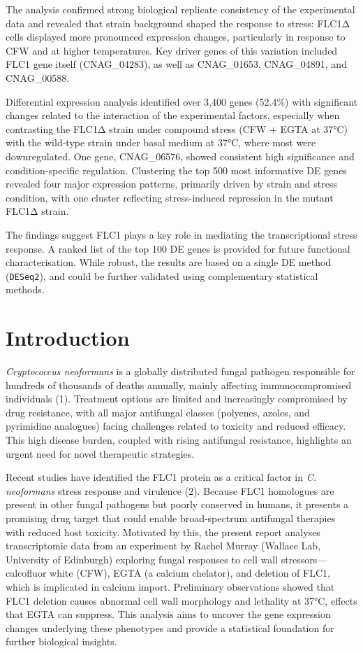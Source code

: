 \documentclass[
  a4paper,
]{scrreprt}
\begin{document}
The analysis confirmed strong biological replicate consistency of the
experimental data and revealed that strain background shaped the
response to stress: FLC1Δ cells displayed more pronounced expression
changes, particularly in response to CFW and at higher temperatures. Key
driver genes of this variation included FLC1 gene itself (CNAG\_04283),
as well as CNAG\_01653, CNAG\_04891, and CNAG\_00588.

Differential expression analysis identified over 3,400 genes (52.4\%)
with significant changes related to the interaction of the experimental
factors, especially when contrasting the FLC1Δ strain under compound
stress (CFW + EGTA at 37°C) with the wild-type strain under basal medium
at 37°C, where most were downregulated. One gene, CNAG\_06576, showed
consistent high significance and condition-specific regulation.
Clustering the top 500 most informative DE genes revealed four major
expression patterns, primarily driven by strain and stress condition,
with one cluster reflecting stress-induced repression in the mutant
FLC1Δ strain.

The findings suggest FLC1 plays a key role in mediating the
transcriptional stress response. A ranked list of the top 100 DE genes
is provided for future functional characterisation. While robust, the
results are based on a single DE method (\texttt{DESeq2}), and could be
further validated using complementary statistical methods.


\chapter{Introduction}\label{introduction}

\emph{Cryptococcus neoformans} is a globally distributed fungal pathogen
responsible for hundreds of thousands of deaths annually, mainly
affecting immunocompromised individuals (1). Treatment options are
limited and increasingly compromised by drug resistance, with all major
antifungal classes (polyenes, azoles, and pyrimidine analogues) facing
challenges related to toxicity and reduced efficacy. This high disease
burden, coupled with rising antifungal resistance, highlights an urgent
need for novel therapeutic strategies.

Recent studies have identified the FLC1 protein as a critical factor in
\emph{C. neoformans} stress response and virulence (2). Because FLC1
homologues are present in other fungal pathogens but poorly conserved in
humans, it presents a promising drug target that could enable
broad-spectrum antifungal therapies with reduced host toxicity.
Motivated by this, the present report analyses transcriptomic data from
an experiment by Rachel Murray (Wallace Lab, University of Edinburgh)
exploring fungal responses to cell wall stressors---calcofluor white
(CFW), EGTA (a calcium chelator), and deletion of FLC1, which is
implicated in calcium import. Preliminary observations showed that FLC1
deletion causes abnormal cell wall morphology and lethality at 37°C,
effects that EGTA can suppress. This analysis aims to uncover the gene
expression changes underlying these phenotypes and provide a statistical
foundation for further biological insights.
\end{document}
